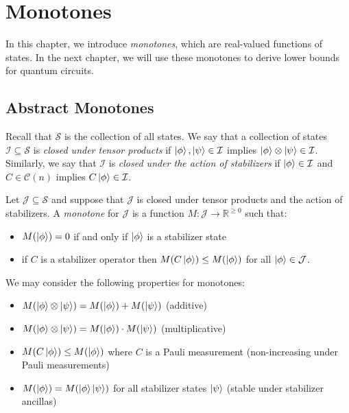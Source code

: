 \documentclass[12pt]{dalthesis}
\begin{document}
\chapter{Monotones}
\label{monotones}
In this chapter, we introduce \emph{monotones}, which are real-valued functions of states. In the next chapter, we will use these monotones to derive lower bounds for quantum circuits.  

\section{Abstract Monotones}
Recall that $\mathcal{S}$ is the collection of all states. We say that a collection of states $\mathcal{I} \subseteq \mathcal{S}$ is \emph{closed under tensor products} if $\ket{\phi}, \ket{\psi} \in \mathcal{I}$ implies $\ket{\phi} \otimes \ket{\psi} \in \mathcal{I}$. Similarly, we say that $\mathcal{I}$ is \emph{closed under the action of stabilizers} if $\ket{\phi} \in \mathcal{I}$ and $C \in \mathcal{C}(n)$ implies $C\ket{\phi} \in \mathcal{I}$.

\begin{definition}
Let $\mathcal{J} \subseteq \mathcal{S}$ and suppose that $\mathcal{J}$ is closed under tensor products and the action of stabilizers. A \emph{monotone} for $\mathcal{J}$ is a function $M: \mathcal{J} \rightarrow \mathbb{R}^{\geq 0}$ such that:
\begin{itemize}
\item $M(\ket{\phi}) = 0$ if and only if $\ket{\phi}$ is a stabilizer state
\item if $C$ is a stabilizer operator then $M(C\ket{\phi}) \leq M(\ket{\phi})$ for all $\ket{\phi} \in \mathcal{J}$.
\end{itemize} 
\end{definition}

\begin{proposition} 
We may consider the following properties for monotones:
\begin{itemize}
\item $M(\ket{\phi} \otimes \ket{\psi}) = M(\ket{\phi}) + M(\ket{\psi})$ (additive) 
\item $M(\ket{\phi} \otimes \ket{\psi}) = M(\ket{\phi}) \cdot M(\ket{\psi})$ (multiplicative)
\item $M(C\ket{\phi}) \leq M(\ket{\phi})$ where $C$ is a Pauli measurement (non-increasing under Pauli measurements)
\item $M(\ket{\phi}) = M(\ket{\phi}\ket{\psi})$ for all stabilizer states $\ket{\psi}$ (stable under stabilizer ancillas)
\end{itemize}
\end{proposition}
\end{document}
